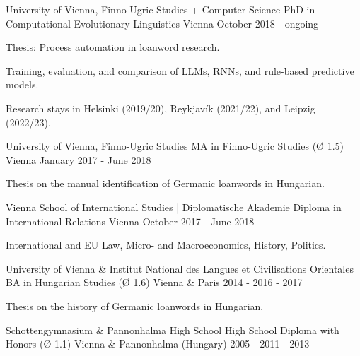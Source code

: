 

\begin{cventries}

  \cventry
    {University of Vienna, Finno-Ugric Studies + Computer Science} %
    {PhD in Computational Evolutionary Linguistics} %
    {Vienna} %
    {October 2018 - ongoing} %
    {
      \begin{cvitems} %
        \item{Thesis: Process automation in loanword research.}
        \item{Training, evaluation, and comparison of LLMs, RNNs, and rule-based predictive models.}
        \item{Research stays in Helsinki (2019/20), Reykjavík (2021/22), and Leipzig (2022/23).}
      \end{cvitems}
    }

  \cventry
    {University of Vienna, Finno-Ugric Studies} %
    {MA in Finno-Ugric Studies (Ø 1.5)} %
    {Vienna} %
    {January 2017 - June 2018} %
    {
      \begin{cvitems} %
        \item{Thesis on the manual identification of Germanic loanwords in Hungarian.}
      \end{cvitems}
    }

  \cventry
    {Vienna School of International Studies | Diplomatische Akademie} %
    {Diploma in International Relations} %
    {Vienna} %
    {October 2017 - June 2018} %
    {
    \begin{cvitems} %
        \item{International and EU Law, Micro- and Macroeconomics, History, Politics.}
      \end{cvitems}
    }
    
  \cventry
    {University of Vienna \& Institut National des Langues et Civilisations Orientales} %
    {BA in Hungarian Studies (Ø 1.6)} %
    {Vienna \& Paris} %
    {2014 - 2016 - 2017} %
    {
      \begin{cvitems} %
        \item{Thesis on the history of Germanic loanwords in Hungarian.}
      \end{cvitems}
    }
        
  \cventry
    {Schottengymnasium \& Pannonhalma High School} %
    {High School Diploma with Honors (Ø 1.1)} %
    {Vienna \& Pannonhalma (Hungary)} %
    {2005 - 2011 - 2013} %
    {}
\end{cventries}
